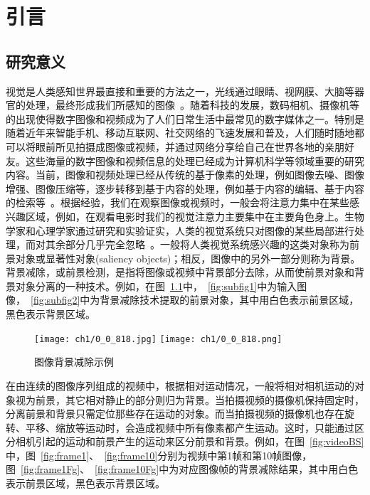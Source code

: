 \chapter{引言}
\label{cha:intro}

\section{研究意义}
\label{sec:first}
视觉是人类感知世界最直接和重要的方法之一，光线通过眼睛、视网膜、大脑等器官的处理，最终形成我们所感知的图像~\cite{GonzalezDIP}。随着科技的发展，数码相机、摄像机等的出现使得数字图像和视频成为了人们日常生活中最常见的数字媒体之一。特别是随着近年来智能手机、移动互联网、社交网络的飞速发展和普及，人们随时随地都可以将眼前所见拍摄成图像或视频，并通过网络分享给自己在世界各地的亲朋好友。这些海量的数字图像和视频信息的处理已经成为计算机科学等领域重要的研究内容。当前，图像和视频处理已经从传统的基于像素的处理，例如图像去噪、图像增强、图像压缩等，逐步转移到基于内容的处理，例如基于内容的编辑、基于内容的检索等~\cite{CMM12THU}。根据经验，我们在观察图像或视频时，一般会将注意力集中在某些感兴趣区域，例如，在观看电影时我们的视觉注意力主要集中在主要角色身上。生物学家和心理学家通过研究和实验证实，人类的视觉系统只对图像的某些局部进行处理，而对其余部分几乎完全忽略~\cite{treisman1980a,Koch1985Shifts}。一般将人类视觉系统感兴趣的这类对象称为前景对象或显著性对象(saliency objects)；相反，图像中的另外一部分则称为背景。背景减除，或前景检测，是指将图像或视频中背景部分去除，从而使前景对象和背景对象分离的一种技术。例如，在图~\ref{fig:1}中，~\ref{fig:subfig1}中为输入图像，~\ref{fig:subfig2}中为背景减除技术提取的前景对象，其中用白色表示前景区域，黑色表示背景区域。\par
\begin{figure}[ht]
  \centering%
    {\texttt{[image: ch1/0\_0\_818.jpg]}}%
 \hspace{1em}%
      {\texttt{[image: ch1/0\_0\_818.png]}}
  \caption{图像背景减除示例}
  \label{fig:1}
\end{figure}
在由连续的图像序列组成的视频中，根据相对运动情况，一般将相对相机运动的对象视为前景，其它相对静止的部分则归为背景。当拍摄视频的摄像机保持固定时，分离前景和背景只需定位那些存在运动的对象。而当拍摄视频的摄像机也存在旋转、平移、缩放等运动时，会造成视频中所有像素都产生运动。这时，只能通过区分相机引起的运动和前景产生的运动来区分前景和背景。例如，在图~\ref{fig:videoBS}中，图~\ref{fig:frame1}、~\ref{fig:frame10}分别为视频中第1帧和第10帧图像，图~\ref{fig:frame1Fg}、~\ref{fig:frame10Fg}中为对应图像帧的背景减除结果，其中用白色表示前景区域，黑色表示背景区域。
